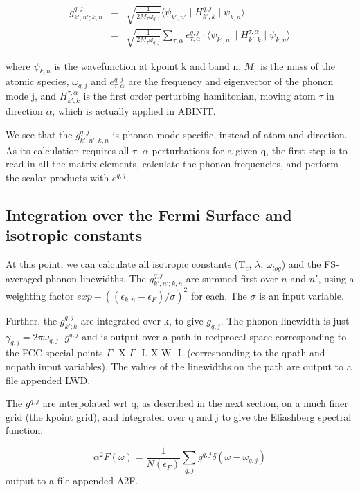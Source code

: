 \documentclass[aps,preprint]{revtex4}
\begin{document}
\begin{eqnarray}
g^{q,j}_{k',n';k,n} &=& \sqrt{\frac{1}{2 M_\tau \omega_{q,j}}} \langle \psi_{k',n'} \mid H^{q,j}_{k',k} \mid \psi_{k,n}\rangle \\
&=& \sqrt{\frac{1}{2 M_\tau \omega_{q,j}}} \sum_{\tau, \alpha} {e}^{q,j}_{\tau, \alpha} \cdot \langle \psi_{k',n'} \mid H^{\tau, \alpha}_{k',k} \mid \psi_{k,n}\rangle
\end{eqnarray}

where $\psi_{k,n}$ is the wavefunction at kpoint k and band n, $M_\tau$ is the
mass of the atomic species, $\omega_{q,j}$ and ${e}^{q,j}_{\tau, \alpha}$
are the frequency and eigenvector of the phonon mode j, and $H^{\tau,
\alpha}_{k',k}$ is the first order perturbing hamiltonian, moving atom $\tau$
in direction $\alpha$, which is actually applied in ABINIT.

We see that the $g^{q,j}_{k',n';k,n}$ is phonon-mode specific, instead of atom and
direction. As its calculation requires all $\tau$, $\alpha$ perturbations for a given q,
the first step is to read in all the matrix elements, calculate the phonon
frequencies, and perform the scalar products with ${e}^{q,j}$.

\subsection{Integration over the Fermi Surface and isotropic constants}
At this point, we can calculate all isotropic constants (T$_c$, $\lambda$,
$\omega_{log}$) and the FS-averaged phonon linewidths. The
$g^{q,j}_{k',n';k,n}$ are summed first over $n$ and $n'$, using a weighting factor
$exp -((\epsilon_{k,n} - \epsilon_F )/\sigma)^2$ for each. The $\sigma$ is an input variable.

Further, the $g^{q,j}_{k';k}$ are integrated over k, to give $g_{q,j}$. The
phonon linewidth is just $\gamma_{q,j} = 2 \pi \omega_{q,j} \cdot g^{q,j}$ and
is output over a path in reciprocal space corresponding to the FCC special
points $\Gamma$ -X-$\Gamma$ -L-X-W -L (corresponding to the qpath and nqpath
input variables). The values of the linewidths on the path are output to a file
appended LWD.

The $g^{q,j}$ are interpolated wrt q, as described in the next section, on a much
finer grid (the kpoint grid), and integrated over q and j to give the
Eliashberg spectral function:

\begin{equation}
\alpha^2 F(\omega) = \frac{1}{N(\epsilon_F)} \sum_{q,j} g^{q,j} \delta(\omega - \omega_{q,j})
\end{equation}
output to a file appended A2F.
\end{document}
